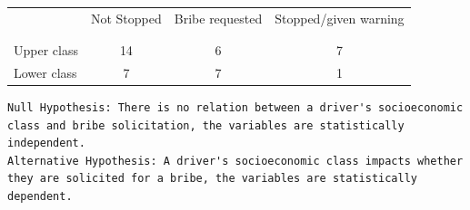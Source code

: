 \documentclass[12pt,letterpaper]{article}
\begin{document}
\newpage
\begin{table}[h!]
	\centering
	\begin{tabular}{l | c c c }
		& Not Stopped & Bribe requested & Stopped/given warning \\
		\\[-1.8ex] 
		\hline \\[-1.8ex]
		Upper class & 14 & 6 & 7 \\
		Lower class & 7 & 7 & 1 \\
		\hline
	\end{tabular}
\end{table}
\begin{Verbatim}
Null Hypothesis: There is no relation between a driver's socioeconomic 
class and bribe solicitation, the variables are statistically independent.
Alternative Hypothesis: A driver's socioeconomic class impacts whether
they are solicited for a bribe, the variables are statistically dependent.
\end{Verbatim}
\end{document}
